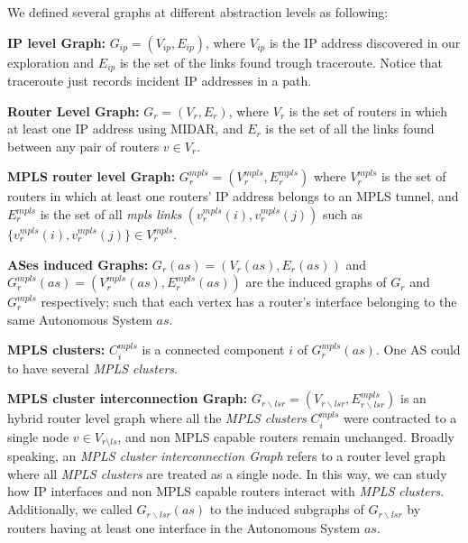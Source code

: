 We defined several graphs at different abstraction levels as following: 


\textbf{IP level Graph:} $G_{ip}=(V_{ip}, E_{ip})$, where $V_{ip}$ is the IP address discovered in our exploration and $E_{ip}$ is the set of the links found trough traceroute.
Notice that traceroute just records incident IP addresses in a path.

\textbf{Router Level Graph:} $G_{r}=(V_{r}, E_{r})$, where $V_{r}$ is the set of routers in which at least one IP address using MIDAR, and $E_{r}$ is the set of all the links found between any pair of routers $v\in V_{r}$.

\textbf{MPLS router level Graph:} $G^{mpls}_{r}=(V^{mpls}_{r}, E^{mpls}_{r})$ where  $V^{mpls}_{r}$ is the set of routers in which at least one routers' IP address belongs to an MPLS tunnel, and  $E^{mpls}_{r}$ is the set of all \textit{mpls links} $(v^{mpls}_{r}(i), v^{mpls}_{r}(j))$ such as 
$\{{v^{mpls}_{r}(i)},{v^{mpls}_{r}(j)} \}\in V^{mpls}_{r}$.

\textbf{ASes induced Graphs:} $G_{r}(as)=(V_{r}(as), E_{r}(as))$ and $G^{mpls}_{r}(as)=(V^{mpls}_{r}(as), E^{mpls}_{r}(as))$ are the induced graphs of $G_{r}$ and $G^{mpls}_{r}$ respectively; such that each vertex has a router's interface belonging to the same Autonomous System $as$.

\textbf{MPLS clusters:} $C^{mpls}_{i}$ is a connected component $i$ of $G^{mpls}_{r}(as)$. 
One AS could to have several \textit{MPLS clusters}.    

\textbf{MPLS cluster interconnection Graph:} $G_{r\backslash lsr}=(V_{r\backslash lsr},E^{mpls}_{r\backslash lsr})$ is an hybrid router level graph where all the \textit{MPLS clusters}  $C^{mpls}_{i}$ were contracted to a single node $v\in V_{r\setminus ls}$, and non MPLS capable routers remain unchanged. 
Broadly speaking, an \textit{MPLS cluster interconnection Graph} refers to a router level graph where all \textit{MPLS clusters} are treated as a single node. In this way, we can study how IP interfaces and non MPLS capable routers interact with \textit{MPLS clusters}. 
Additionally, we called $G_{r\backslash lsr}(as)$ to the induced subgraphs of $G_{r\backslash lsr}$ by routers having at least one interface in the Autonomous System $as$.


